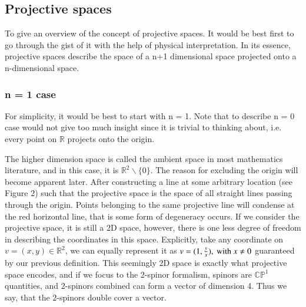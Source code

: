 \documentclass{article}
\begin{document}
\subsection{Projective spaces}



To give an overview of the concept of projective spaces. It would be
best first to go through the gist of it with the help of physical
interpretation. 
In its essence, projective spaces describe the space of a n+1 dimensional
space projected onto a n-dimensional space. 

\subsubsection{n = 1 case}%
  \label{sub:n = 1 case}
  

For simplicity, it would be best to start with n = 1. Note that to describe
n = 0 case would not give too much insight since it is trivial to thinking
about, i.e. every point on $ \mathbb{R} $ projects onto the origin. 

The higher dimension space is called the ambient space in most mathematics
literature, and in this case, it is $  \mathbb{R}^{2} \backslash \{0\} $.
The reason for excluding the origin will become apparent later. After
constructing a
line at some arbitrary location (see Figure 2) such that the 
projective space is the space of all straight lines passing through the
origin. Points belonging to the same projective line will condense at
the red horizontal line, that is some form of degeneracy occurs. If we
consider the projective space, it is still a 2D space, however, there is one
less degree of freedom in describing the coordinates in this space.
Explicitly, take any coordinate on $ v = (x, y) \in \mathbb{R}^2 $, we can
equally represent it as $ v = (1, \frac{y}{x}), \textnormal{ with } x \neq 0
$ guaranteed by our previous definition. This seemingly 2D space is exactly
what projective space encodes, and if we focus to the 2-spinor formalism,
spinors are $\mathbb{CP}^{1}$ quantities, and 2-spinors combined can form a
vector of dimension 4. Thus we say, that the 2-spinors double cover a vector.  

\\ 
\end{document}

